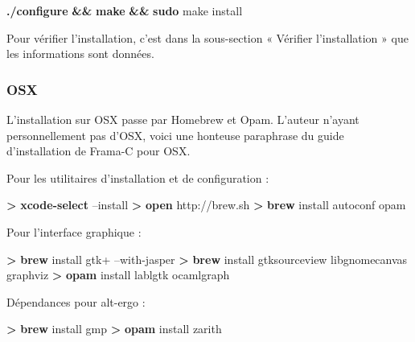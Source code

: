 \documentclass[12pt,francais,]{scrbook}
\newenvironment{Shaded}{}{}
\newcommand{\KeywordTok}[1]{\textcolor[rgb]{0.00,0.44,0.13}{\textbf{{#1}}}}
\newcommand{\NormalTok}[1]{{#1}}
\begin{document}
\begin{footnotesize}\begin{Shaded}
\begin{Highlighting}[]
\KeywordTok{./configure} \KeywordTok{&&} \KeywordTok{make} \KeywordTok{&&} \KeywordTok{sudo} \NormalTok{make install}
\end{Highlighting}
\end{Shaded}\end{footnotesize}

Pour vérifier l'installation, c'est dans la sous-section « Vérifier
l'installation » que les informations sont données.

\subsubsection{OSX}\label{osx}

L'installation sur OSX passe par Homebrew et Opam. L'auteur n'ayant
personnellement pas d'OSX, voici une honteuse paraphrase du guide
d'installation de Frama-C pour OSX.

Pour les utilitaires d'installation et de configuration :

\begin{footnotesize}\begin{Shaded}
\begin{Highlighting}[]
\KeywordTok{>} \KeywordTok{xcode-select} \NormalTok{--install }
\KeywordTok{>} \KeywordTok{open} \NormalTok{http://brew.sh}
\KeywordTok{>} \KeywordTok{brew} \NormalTok{install autoconf opam }
\end{Highlighting}
\end{Shaded}\end{footnotesize}

Pour l'interface graphique :

\begin{footnotesize}\begin{Shaded}
\begin{Highlighting}[]
\KeywordTok{>} \KeywordTok{brew} \NormalTok{install gtk+ --with-jasper}
\KeywordTok{>} \KeywordTok{brew} \NormalTok{install gtksourceview libgnomecanvas graphviz}
\KeywordTok{>} \KeywordTok{opam} \NormalTok{install lablgtk ocamlgraph }
\end{Highlighting}
\end{Shaded}\end{footnotesize}

Dépendances pour alt-ergo :

\begin{footnotesize}\begin{Shaded}
\begin{Highlighting}[]
\KeywordTok{>} \KeywordTok{brew} \NormalTok{install gmp}
\KeywordTok{>} \KeywordTok{opam} \NormalTok{install zarith}
\end{Highlighting}
\end{Shaded}\end{footnotesize}
\end{document}
